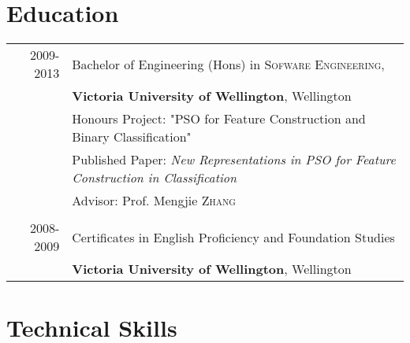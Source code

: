 \documentclass[a4paper,10pt]{article} %
\begin{document}


\section{Education}

\begin{tabular}{rl}	
\textsc{2009-2013} & Bachelor of Engineering (Hons) in \textsc{Sofware Engineering},\\
&\textbf{Victoria University of Wellington}, Wellington\\
& Honours Project: "PSO for Feature Construction and Binary Classification" \\
& Published Paper: \emph{New Representations in PSO for Feature Construction in Classification}\\
& \small Advisor: Prof. Mengjie \textsc{Zhang}\\
& \\


\textsc{2008-} 2009& Certificates in English Proficiency and Foundation Studies\\
&\textbf{Victoria University of Wellington}, Wellington\\
\end{tabular}



\section{Technical Skills}
\end{document}

